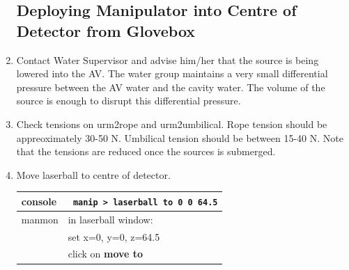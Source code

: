 \documentclass[11pt]{article}
\begin{document}
\begin{enumerate}
\subsection{Deploying Manipulator into Centre of Detector from Glovebox}
\item \CheckBox[name=rluo44]{} Contact Water Supervisor and advise him/her that the source is being lowered into the AV. The water group maintains a very small differential pressure between the AV water and the cavity water. The volume of the source is enough to disrupt this differential pressure.
\item \CheckBox[name=rlup45]{} Check tensions on urm2rope and urm2umbilical. Rope tension should be appreoximately 30-50 N. Umbilical tension should be between 15-40 N. Note that the tensions are reduced once the sources is submerged.
\item \CheckBox[name=rlup46]{} Move laserball to centre of detector.
\begin{center}
\begin{tabular}{|l|l|}
\hline
console & \verb+ manip > laserball to 0 0 64.5+ \\
\hline
manmon & in laserball window: \\ &  set x=0, y=0, z=64.5 \\ & click on {\bf move to} \\
\hline
\end{tabular}
\end{center}

\end{enumerate}
\end{document}
